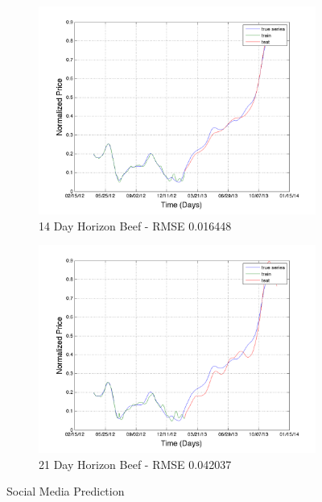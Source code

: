 \begin{figure}[H]
        \begin{subfigure}[b]{0.5\textwidth}
                \includegraphics[width=\textwidth]{img/model/beef/model3_3/pred_14}
                \caption{14 Day Horizon Beef - RMSE 0.016448  }
                \label{fig:tiger}
        \end{subfigure}%
              \begin{subfigure}[b]{0.5\textwidth}
                \includegraphics[width=\textwidth]{img/model/beef/model3_3/pred_21}
                \caption{21 Day Horizon Beef  - RMSE 0.042037 }
                \label{fig:tiger}
        \end{subfigure}%
        \caption{Social Media Prediction}\label{fig:comp_exp}
\end{figure}


